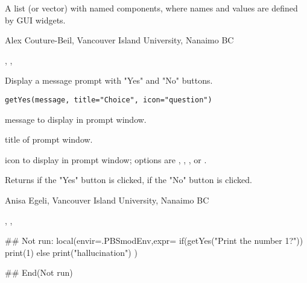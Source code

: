 \documentclass[letterpaper]{book}
\begin{document}
%
\begin{Value}
A list (or vector) with named components, where names and values are defined by GUI widgets.
\end{Value}
%
\begin{Author}\relax
Alex Couture-Beil, Vancouver Island University, Nanaimo BC
\end{Author}
%
\begin{SeeAlso}\relax
{}, , 
\end{SeeAlso}
%
\begin{Description}\relax
Display a message prompt with "Yes" and "No" buttons.
\end{Description}
%
\begin{Usage}
\begin{verbatim}
getYes(message, title="Choice", icon="question")
\end{verbatim}
\end{Usage}
%
\begin{Arguments}
\begin{ldescription}
\item[\code{message}] message to display in prompt window.
\item[\code{title}] title of prompt window.
\item[\code{icon}] icon to display in prompt window; options are 
, , , or .
\end{ldescription}
\end{Arguments}
%
\begin{Value}
Returns  if the "Yes" button is clicked,  if the "No" button is clicked.
\end{Value}
%
\begin{Author}\relax
Anisa Egeli, Vancouver Island University, Nanaimo BC
\end{Author}
%
\begin{SeeAlso}\relax
{}, , 
\end{SeeAlso}
%
\begin{Examples}
\begin{ExampleCode}
## Not run: 
local(envir=.PBSmodEnv,expr={
  if(getYes("Print the number 1?"))
    print(1) else print("hallucination")
})

## End(Not run)
\end{ExampleCode}
\end{Examples}
\end{document}
